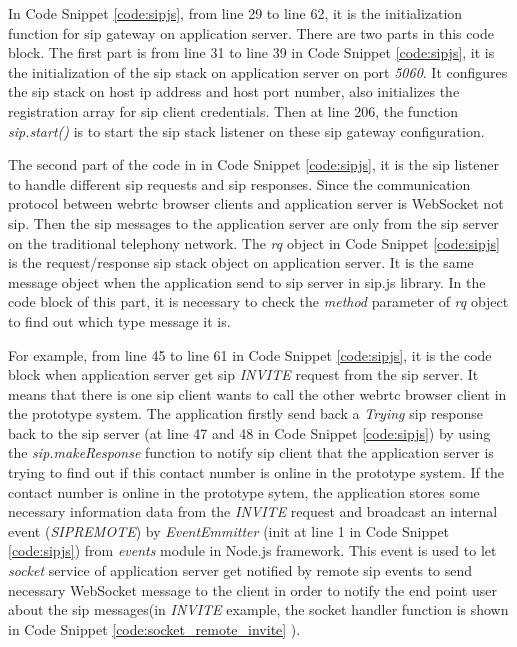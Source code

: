 In Code Snippet \ref{code:sipjs}, from line 29 to line 62, it is the initialization function for \gls{sip} gateway on application server. There are two parts in this code block. The first part is from line 31 to line 39 in Code Snippet \ref{code:sipjs}, it is the initialization of the \gls{sip} stack on application server on port \textit{5060}. It configures the \gls{sip} stack on host \gls{ip} address and host port number, also initializes the registration array for sip client credentials. Then at line 206, the function \textit{sip.start()} is to start the \gls{sip} stack listener on these \gls{sip} gateway configuration. 

\par The second part of the code in in Code Snippet \ref{code:sipjs}, it is the \gls{sip} listener to handle different \gls{sip} requests and \gls{sip} responses. Since the communication protocol between \gls{webrtc} browser clients and application server is WebSocket not \gls{sip}. Then the \gls{sip} messages to the application server are only from the \gls{sip} server on the traditional telephony network. The \textit{rq} object in Code Snippet \ref{code:sipjs} is the request/response \gls{sip} stack object on application server. It is the same message object when the application send to \gls{sip} server in sip.js library. In the code block of this part, it is necessary to check the \textit{method} parameter of \textit{rq} object to find out which type message it is.

\par For example, from line 45 to line 61 in Code Snippet \ref{code:sipjs}, it is the code block when application server get \gls{sip} \textit{INVITE} request from the \gls{sip} server. It means that there is one \gls{sip} client wants to call the other \gls{webrtc} browser client in the prototype system. The application firstly send back a \textit{Trying} \gls{sip} response back to the \gls{sip} server (at line 47 and 48 in Code Snippet \ref{code:sipjs}) by using the \textit{sip.makeResponse} function to notify \gls{sip} client that the application server is trying to find out if this contact number is online in the prototype system. If the contact number is online in the prototype sytem, the application stores some necessary information data from the \textit{INVITE} request and broadcast an internal event (\textit{SIPREMOTE}) by \textit{EventEmmitter} (init at line 1 in Code Snippet \ref{code:sipjs}) from \textit{events} module in Node.js framework. This event is used to let \textit{socket} service of application server get notified by remote \gls{sip} events to send necessary WebSocket message to the client in order to notify the end point user about the \gls{sip} messages(in \textit{INVITE} example, the socket handler function is shown in Code Snippet \ref{code:socket_remote_invite} ).

